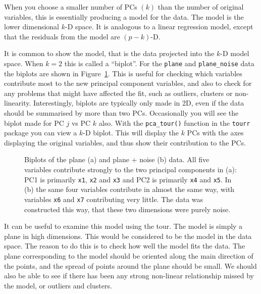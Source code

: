 \documentclass[
  letterpaper,
]{krantz}
\begin{document}

When you choose a smaller number of PCs \((k)\) than the number of
original variables, this is essentially producing a model for the data.
The model is the lower dimensional \(k\)-D space. It is analogous to a
linear regression model, except that the residuals from the model are
\((p-k)\)-D.

It is common to show the model, that is the data projected into the
\(k\)-D model space. When \(k=2\) this is called a ``biplot''. For the
\texttt{plane} and \texttt{plane\_noise} data the biplots are shown in
Figure~\ref{fig-plane-biplot}. This is useful for checking which
variables contribute most to the new principal component variables, and
also to check for any problems that might have affected the fit, such as
outliers, clusters or non-linearity. Interestingly, biplots are
typically only made in 2D, even if the data should be summarised by more
than two PCs. Occasionally you will see the biplot made for PC \(j\) vs
PC \(k\) also. With the \texttt{pca\_tour()} function in the
\texttt{tourr} package you can view a \(k\)-D biplot. This will display
the \(k\) PCs with the axes displaying the original variables, and thus
show their contribution to the PCs.

\begin{figure}


\caption{\label{fig-plane-biplot}Biplots of the plane (a) and plane +
noise (b) data. All five variables contribute strongly to the two
principal components in (a): PC1 is primarily \texttt{x1}, \texttt{x2}
and \texttt{x3} and PC2 is primarily \texttt{x4} and \texttt{x5}. In (b)
the same four variables contribute in almost the same way, with
variables \texttt{x6} and \texttt{x7} contributing very little. The data
was constructed this way, that these two dimensions were purely noise.}

\end{figure}%

It can be useful to examine this model using the tour. The model is
simply a plane in high dimensions. This would be considered to be the
model in the data space. The reason to do this is to check how well the
model fits the data. The plane corresponding to the model should be
oriented along the main direction of the points, and the spread of
points around the plane should be small. We should also be able to see
if there has been any strong non-linear relationship missed by the
model, or outliers and clusters.
\end{document}
